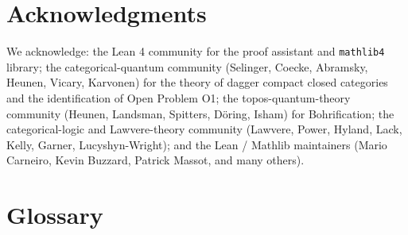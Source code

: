 \documentclass[11pt,a4paper]{article}
\theoremstyle{plain}
\theoremstyle{definition}
\theoremstyle{remark}
\begin{document}
\section*{Acknowledgments}

We acknowledge: the Lean 4 community for the proof assistant and \texttt{mathlib4} library; the categorical-quantum community (Selinger, Coecke, Abramsky, Heunen, Vicary, Karvonen) for the theory of dagger compact closed categories and the identification of Open Problem O1; the topos-quantum-theory community (Heunen, Landsman, Spitters, D\"oring, Isham) for Bohrification; the categorical-logic and Lawvere-theory community (Lawvere, Power, Hyland, Lack, Kelly, Garner, Lucyshyn-Wright); and the Lean / Mathlib maintainers (Mario Carneiro, Kevin Buzzard, Patrick Massot, and many others).




\appendix
\section{Glossary}\label{app:glossary}
\end{document}
